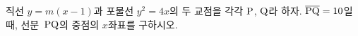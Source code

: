 직선 $y=m(x-1)$과 포물선 $y^2=4x$의 두 교점을 각각 $\mathrm{P}$, $\mathrm{Q}$라 하자. $\overline{\mathrm{PQ}}=10$일 때, 선분~$\mathrm{PQ}$의 중점의 $x$좌표를 구하시오.
